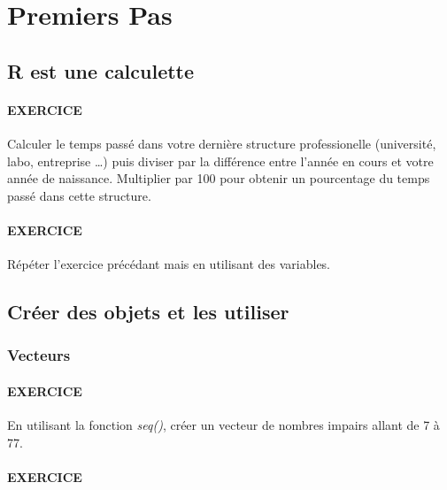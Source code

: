 \section{Premiers Pas}
\subsection{R est une calculette}



\paragraph{EXERCICE} \par 

 Calculer le temps passé dans votre dernière structure professionelle (université, labo, entreprise \dots)
 puis diviser par la différence entre l'année en cours et votre année de naissance. Multiplier par 100 pour obtenir un pourcentage du temps passé  dans cette structure.
 \vspace{1em}


\paragraph{EXERCICE}  \par

Répéter l'exercice précédant mais en utilisant des variables.
\subsection{Créer des objets et les utiliser}

\subsubsection{Vecteurs}



\paragraph{EXERCICE} \par

En utilisant la fonction \emph{seq()}, créer un vecteur de nombres impairs allant de 7 à 77. 

\vspace{1em}


\paragraph{EXERCICE} \par

